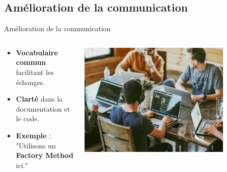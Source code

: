 \documentclass[aspectratio=169]{beamer}
\begin{document}
\subsection{Amélioration de la communication}

\begin{frame}{Amélioration de la communication}
    \begin{columns}
        \begin{column}{0.6\textwidth}
            \begin{itemize}
                \item \textbf{Vocabulaire commun} facilitant les échanges.
                \item \textbf{Clarté} dans la documentation et le code.
                      \pause
                \item \textbf{Exemple} : "Utilisons un \textbf{Factory Method} ici."
            \end{itemize}
        \end{column}
        \begin{column}{0.4\textwidth}
            \begin{center}
                \includegraphics[width=0.8\textwidth]{pic/communication.png}
            \end{center}
        \end{column}
    \end{columns}
\end{frame}
\end{document}
